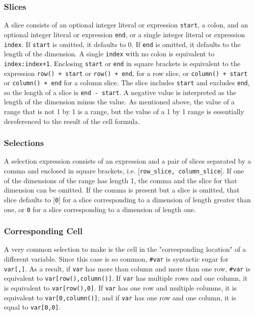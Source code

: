 \subsubsection{Slices}
A slice consists of an optional integer literal or expression \texttt{start}, a colon, and an optional integer literal or expression \texttt{end}, or a single integer literal or expression \texttt{index}. If \texttt{start} is omitted, it defaults to 0. If \texttt{end} is omitted, it defaults to the length of the dimension. A single \texttt{index} with no colon is equivalent to \texttt{index:index+1}. Enclosing \texttt{start} or \texttt{end} in square brackets is equivalent to the expression \texttt{row() + start} or \texttt{row() + end}, for a row slice, or \texttt{column() + start} or \texttt{column() + end} for a column slice. The slice includes \texttt{start} and excludes \texttt{end}, so the length of a slice is \texttt{end - start}. A negative value is interpreted as the length of the dimension minus the value. As mentioned above, the value of a range that is not 1 by 1 is a range, but the value of a 1 by 1 range is essentially dereferenced to the result of the cell formula.
\subsubsection{Selections}
A selection expression consists of an expression and a pair of slices separated by a comma and enclosed in square brackets, i.e. {[}\texttt{row\_slice, column\_slice}{]}. If one of the dimensions of the range has length 1, the comma and the slice for that dimension can be omitted. If the comma is present but a slice is omitted, that slice defaults to {[}\texttt{0}{]} for a slice corresponding to a dimension of length greater than one, or \texttt{0} for a slice corresponding to a dimension of length one.
\subsubsection{Corresponding Cell}
A very common selection to make is the cell in the "corresponding location" of a different variable. Since this case is so common, \texttt{\#var}
is syntactic sugar for \texttt{var{[},{]}}. As a result, if \texttt{var} has more than column and more than one row, \texttt{\#var} is equivalent to \texttt{var{[}row(),column(){]}}. If \texttt{var} has multiple rows and one column, it is equivalent to \texttt{var{[}row(),0{]}}. If \texttt{var} has one row and multiple columns, it is equivalent to \texttt{var{[}0,column(){]}}; and if \texttt{var} has one row and one column, it is equal to \texttt{var{[}0,0{]}}.

